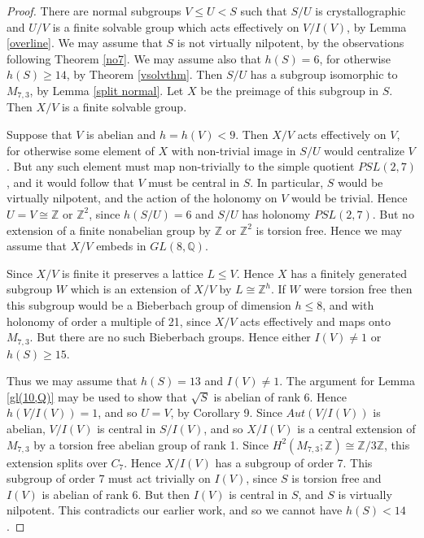 \documentclass[12pt]{amsart}
\renewcommand{\geq}{\geqslant}
\renewcommand{\leq}{\leqslant}
\begin{document}
\begin{proof}
There are normal subgroups $V\leq{U}<S$ such that $S/U$ is crystallographic
and $U/V$ is a finite solvable group which acts effectively on $V/I(V)$,
by Lemma \ref{overline}.
We may assume that $S$ is not virtually nilpotent,
by the observations following Theorem \ref{no7}.
We may assume also that $h(S)=6$, for otherwise $h(S)\geq14$,
by Theorem \ref{vsolvthm}.
Then $S/U$ has  a subgroup isomorphic to $M_{7,3}$, 
by Lemma \ref{split normal}.
Let $X$ be the preimage of this subgroup in $S$.
Then $X/V$ is a finite solvable group.

Suppose that $V$ is abelian and $h=h(V)<9$.
Then $X/V$ acts effectively on $V$,
for otherwise some element of $X$ with non-trivial image in $S/U$ would centralize $V$.
But any such element must map non-trivially to the simple quotient $PSL(2,7)$,
and it would follow that $V$ must be central in $S$.
In particular, $S$ would be virtually nilpotent, 
and the action of the holonomy on $V$ would be trivial.
Hence $U=V\cong\mathbb{Z}$ or $\mathbb{Z}^2$, 
since $h(S/U)=6$ and $S/U$ has holonomy $PSL(2,7)$.
But no extension of a finite nonabelian group by $\mathbb{Z}$ or $\mathbb{Z}^2$
is torsion free.
Hence we may assume that $X/V$ embeds in $GL(8,\mathbb{Q})$.

Since $X/V$ is finite it preserves a lattice $L\leq{V}$.
Hence $X$ has a finitely generated subgroup $W$ which is an extension of $X/V$
by $L\cong\mathbb{Z}^h$.
If $W$ were torsion free then this subgroup would be a Bieberbach group 
of dimension $h\leq8$, and with holonomy of order a multiple of 21,
since $X/V$ acts effectively and maps onto $M_{7,3}$.
But there are no such Bieberbach groups. 
Hence either $I(V)\not=1$ or $h(S)\geq15$.

Thus we may assume that $h(S)=13$ and $I(V)\not=1$.
The argument for Lemma \ref{gl(10,Q)} may be used to show 
that $\sqrt{S}$ is abelian of rank 6.
Hence $h(V/I(V))=1$, and so $U=V$, by Corollary 9.
Since $Aut(V/I(V))$ is abelian, $V/I(V)$ is central in $S/I(V)$,
and so $X/I(V)$ is a central extension of $M_{7,3}$ 
by a torsion free abelian group of rank 1.
Since $H^2(M_{7,3};\mathbb{Z})\cong\mathbb{Z}/3\mathbb{Z}$, 
this extension splits over $C_7$.
Hence $X/I(V)$ has a subgroup of order 7.
This subgroup of order 7 must act trivially on $I(V)$,
since $S$ is torsion free and $I(V)$ is abelian of rank 6.
But then $I(V)$ is central in $S$, and $S$ is virtually nilpotent.
This contradicts our earlier work, and so we cannot have $h(S)<14$.
\end{proof}
\end{document}
